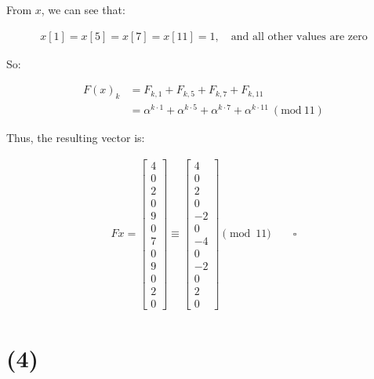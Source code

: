 \documentclass{article}
\newcommand{\modwos}[1]{\ (\mathrm{mod}\ #1)}
\begin{document}
From $x$, we can see that:

\begin{align*}
    x[1] = x[5] = x[7] = x[11] = 1, \quad \text{and all other values are zero}
\end{align*}

So:

\begin{align*}
    F(x)_k 
    &= F_{k,1} + F_{k,5} + F_{k,7} + F_{k,11} \\
    &= \alpha^{k \cdot 1} + \alpha^{k \cdot 5} + \alpha^{k \cdot 7} + \alpha^{k \cdot 11} \modwos{11}
\end{align*}

Thus, the resulting vector is:

\begin{align*}
    Fx =
    \begin{bmatrix}
        4 \\
        0 \\
        2 \\
        0 \\
        9 \\
        0 \\
        7 \\
        0 \\
        9 \\
        0 \\
        2 \\
        0
    \end{bmatrix}
    \equiv
    \begin{bmatrix}
        4 \\
        0 \\
        2 \\
        0 \\
        -2 \\
        0 \\
        -4 \\
        0 \\
        -2 \\
        0 \\
        2 \\
        0
    \end{bmatrix}
    \pmod{11} \qquad \square
\end{align*}




\section*{(4)}
\end{document}
